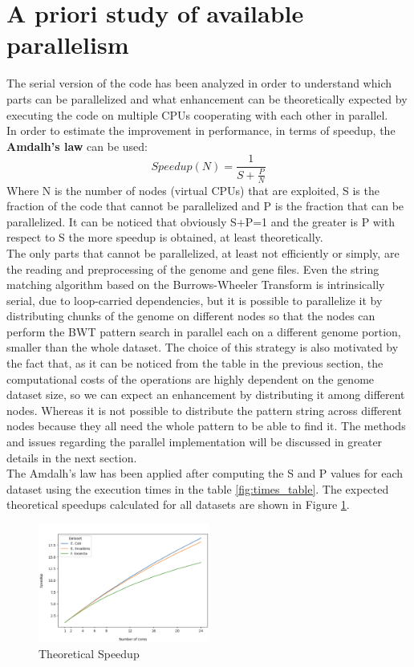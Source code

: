 \documentclass[final,5p,times,twocolumn,authoryear]{elsarticle}
\begin{document}
\section{A priori study of available parallelism}
The serial version of the code has been analyzed in order to understand which parts can be parallelized and what enhancement can be theoretically expected by executing the code on multiple CPUs cooperating with each other in parallel.\\
In order to estimate the improvement in performance, in terms of speedup, the \textbf{Amdalh's law} can be used:
$$ Speedup(N) = \frac{1}{S + \frac{P}{N}} $$
Where N is the number of nodes (virtual CPUs) that are exploited, S is the fraction of the code that cannot be parallelized and P is the fraction that can be parallelized. It can be noticed that obviously S+P=1 and the greater is P with respect to S the more speedup is obtained, at least theoretically.\\
The only parts that cannot be parallelized, at least not efficiently or simply, are the reading and preprocessing of the genome and gene files. Even the string matching algorithm based on the Burrows-Wheeler Transform is intrinsically serial, due to loop-carried dependencies, but it is possible to parallelize it by distributing chunks of the genome on different nodes so that the nodes can perform the BWT pattern search in parallel each on a different genome portion, smaller than the whole dataset. The choice of this strategy is also motivated by the fact that, as it can be noticed from the table in the previous section, the computational costs of the operations are highly dependent on the genome dataset size, so we can expect an enhancement by distributing it among different nodes. Whereas it is not possible to distribute the pattern string across different nodes because they all need the whole pattern to be able to find it. The methods and issues regarding the parallel implementation will be discussed in greater details in the next section. \\
The Amdalh's law has been applied after computing the S and P values for each dataset using the execution times in the table \ref{fig:times_table}. The expected theoretical speedups calculated for all datasets are shown in Figure \ref{fig:theoretical-speedup-label}.
\begin{figure}
    \centering
    \includegraphics[width=0.5\textwidth]{images/theoretical_speedup.png}
    \caption{Theoretical Speedup}
    \label{fig:theoretical-speedup-label}
\end{figure}
\end{document}
